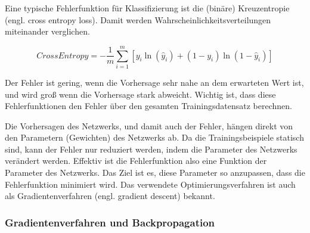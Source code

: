 Eine typische Fehlerfunktion für Klassifizierung ist die (binäre) Kreuzentropie (engl. cross entropy loss). Damit werden Wahrscheinlichkeitsverteilungen miteinander verglichen.

\begin{equation}
\label{eqn:crossentropy}
CrossEntropy = -\frac{1}{m}\sum_{i=1}^{m} [y_i\ln(\hat{y}_i)+(1-y_i)\ln(1-\hat{y}_i)]
\end{equation}

Der Fehler ist gering, wenn die Vorhersage sehr nahe an dem erwarteten Wert ist, und wird groß wenn die Vorhersage stark abweicht. Wichtig ist, dass diese Fehlerfunktionen den Fehler über den gesamten Trainingsdatensatz berechnen.\\
\par 
Die Vorhersagen des Netzwerks, und damit auch der Fehler, hängen direkt von den Parametern (Gewichten) des Netzwerks ab. Da die Trainingsbeispiele statisch sind, kann der Fehler nur reduziert werden, indem die Parameter des Netzwerks verändert werden. Effektiv ist die Fehlerfunktion also eine Funktion der Parameter des Netzwerks. Das Ziel ist es, diese Parameter so anzupassen, dass die Fehlerfunktion minimiert wird. Das verwendete Optimierungsverfahren ist auch als Gradientenverfahren (engl. gradient descent) bekannt.

\subsubsection{Gradientenverfahren und Backpropagation}

